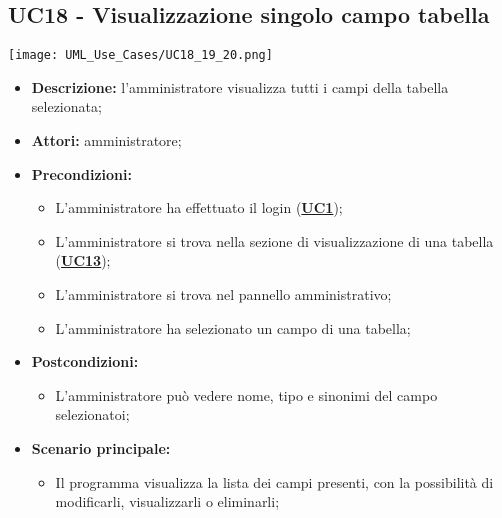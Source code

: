 \subsection{UC18 - Visualizzazione singolo campo tabella}
\label{sec:UC18}
\texttt{[image: UML\_Use\_Cases/UC18\_19\_20.png]}
\begin{itemize}
	\item \textbf{Descrizione:} l’amministratore visualizza tutti i campi della tabella selezionata;
	\item \textbf{Attori:} amministratore;
	\item \textbf{Precondizioni:} 
	\begin{itemize}
		\item L’amministratore ha effettuato il login (\hyperref[sec:UC1]{\textbf{UC1}});
		\item L’amministratore si trova nella sezione di visualizzazione di una tabella (\hyperref[sec:UC13]{\textbf{UC13}});
		\item L’amministratore si trova nel pannello amministrativo;
		\item L'amministratore ha selezionato un campo di una tabella;
	\end{itemize}
	\item \textbf{Postcondizioni:} 
	\begin{itemize}
		\item L'amministratore può vedere nome, tipo e sinonimi del campo selezionatoi;
	\end{itemize}
	\item \textbf{Scenario principale:} 
	\begin{itemize}
		\item Il programma visualizza la lista dei campi presenti, con la possibilità di modificarli, visualizzarli o eliminarli;
	\end{itemize}
\end{itemize}

